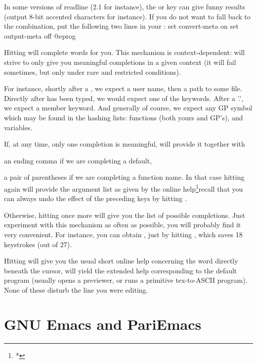  In some versions of readline (2.1 for instance), the
 or  key can give funny results (output 8-bit accented
characters for instance). If you do not want to fall back to the 
combination, put the following two lines in your :
%
\bprog
  set convert-meta on
  set output-meta off
@eprog

 Hitting
 will complete words for you. This mechanism is context-dependent:
 will strive to only give you meaningful completions in a given
context (it will fail sometimes, but only under rare and restricted
conditions).

  For instance, shortly after a \kbd{\til}, we expect a user name, then a
path to some file. Directly after  has been typed, we would
expect one of the  keywords. After a '.', we expect a member
keyword. And generally of course, we expect any GP symbol which may be found
in the hashing lists: functions (both yours and GP's), and variables.

  If, at any time, only one completion is meaningful,  will provide it
together with

\item an ending comma if we are completing a default,

\item a pair of parentheses if we are completing a function name. In
that case hitting  again will provide the argument list as given
by the online help\footnote{*}{recall that you can always undo the effect
of the preceding keys by hitting }.

Otherwise, hitting  once more will give you the list of possible
completions. Just experiment with this mechanism as often as possible,
you will probably find it very convenient. For instance, you can obtain
, just by hitting ,
which saves 18 keystrokes (out of 27).

  Hitting  will give you the usual short online help concerning the
word directly beneath the cursor,  will yield the extended help
corresponding to the  default program (usually opens a 
previewer, or runs a primitive tex-to-ASCII program). None of these disturb
the line you were editing.

\section{GNU Emacs and PariEmacs}
\label{se:emacs}

